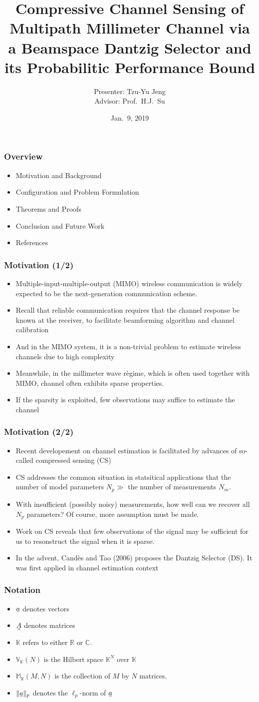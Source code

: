 \documentclass{beamer}
\title{Compressive Channel Sensing of Multipath Millimeter Channel via a Beamspace Dantzig Selector and its Probabilitic Performance Bound}
\author{Presenter: Tzu-Yu Jeng \\ Advisor: Prof.\ H.J.\ Su}
\date{Jan.\ 9, 2019}
\institute{Graduate Instute of Commnication Engineering, NTU}
\newcommand{\I}{\item}
\newcommand{\MB}[1]{\mathbb{#1}}
\newcommand{\V}[1]{\stackunder[1.2pt]{$#1$}{\rule{.9ex}{.075ex}}}
\newcommand{\M}[1]{\V{\V{#1}}}
\begin{document}
 
\frame{\titlepage}
 
\begin{frame}
\frametitle{Overview}
\begin{itemize}
\I Motivation and Background 
\I Configuration and Problem Formulation
\I Theorems and Proofs
\I Conclusion and Future Work
\I References
\end{itemize}
\end{frame}

\begin{frame}
\frametitle{Motivation (1/2)}
\begin{itemize}
\I Multiple-input-multiple-output (MIMO) wireless communication is widely expected to be the next-generation communication scheme.
\I Recall that reliable communication requires that the channel response be known at the receiver, to facilitate beamforming algorithm and channel calibration
\I And in the MIMO system, it is a non-trivial problem to estimate wireless channels due to high complexity
\I Meanwhile, in the millimeter wave r\`egime, which is often used together with MIMO, channel often exhibits sparse properties.
\I If the sparsity is exploited, few observations may suffice to estimate the channel
\end{itemize}
\end{frame}

\begin{frame}
\frametitle{Motivation (2/2)}
\begin{itemize}
\I Recent developement on channel estimation is facilitated by advances of so-called compressed sensing (CS)
\I CS addresses the common situation in statsitical applications that the number of model parameters \(N_p \gg\) the number of measurements \(N_m\).
\I With insufficient (possibly noisy) measurements, how well can we recover all \(N_p\) parameters?
Of course, more assumption must be made.
\I Work on CS reveals that few observations of the signal may be sufficient for us to resonstruct the signal when it is sparse.
\I In the advent, Cand\`es and Tao (2006) proposes the Dantzig Selector (DS).
It was first applied in channel estimation context
\end{itemize}
\end{frame}

\begin{frame}
\frametitle{Notation}
\begin{itemize}
\I \(\V{a}\) denotes vectors
\I \(\M{A}\) denotes matrices
\I \(\MB{K}\) refers to either \(\MB{R}\) or \(\MB{C}\).
\I \(\MB{V}_{\MB{K}} (N)\) is the Hilbert space \(\MB{K}^N\) over \(\MB{K}\)
\I \(\MB{M}_{\MB{K}} (M,N)\) is the collection of \(M\) by \(N\) matrices.
\I \(\|\V{a}\|_p\) denotes the \(\ell_p\)-norm of \(\V{a}\)
\end{itemize}
\end{frame}
\end{document}
